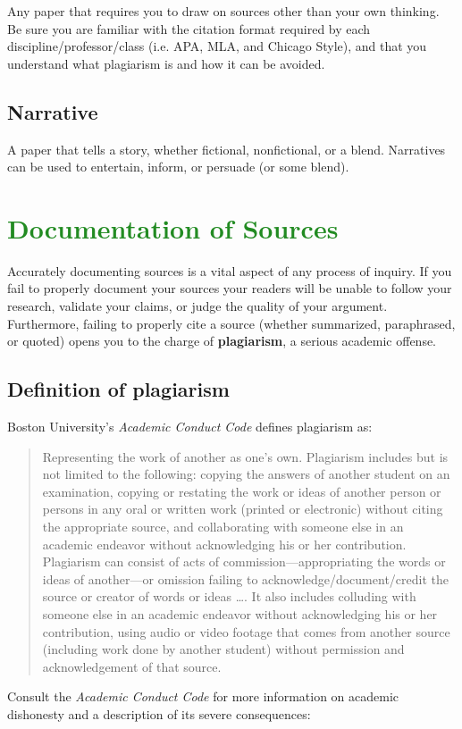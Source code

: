 \documentclass[12pt, hidelinks]{article} %
\begin{document}
Any paper that requires you to draw on sources other than your own thinking. Be sure you are familiar with the citation format required by each discipline/professor/class (i.e. APA, MLA, and Chicago Style), and that you understand what plagiarism is and how it can be avoided.

\subsection{Narrative}

A paper that tells a story, whether fictional, nonfictional, or a blend. Narratives can be used to entertain, inform, or persuade (or some blend).


\section{\textcolor{ForestGreen}{Documentation of Sources}}

Accurately documenting sources is a vital aspect of any process of inquiry. If you fail to properly document your sources your readers will be unable to follow your research, validate your claims, or judge the quality of your argument. Furthermore, failing to properly cite a source (whether summarized, paraphrased, or quoted) opens you to the charge of \textbf{plagiarism}, a serious academic offense.

\subsection{Definition of plagiarism}

Boston University's \emph{Academic Conduct Code} defines plagiarism as:

\begin{quote}Representing the work of another as one's own. Plagiarism includes but is not limited to the following: copying the answers of another student on an examination, copying or restating the work or ideas of another person or persons in any oral or written work (printed or electronic) without citing the appropriate source, and collaborating with someone else in an academic endeavor without acknowledging his or her contribution. Plagiarism can consist of acts of commission---appropriating the words or ideas of another---or omission failing to acknowledge/document/credit the source or creator of words or ideas \dots. It also includes colluding with someone else in an academic endeavor without acknowledging his or her contribution, using audio or video footage that comes from another source (including work done by another student) without permission and acknowledgement of that source.
\end{quote}
Consult the \emph{Academic Conduct Code} for more information on academic dishonesty and a description of its severe consequences:
\end{document}
